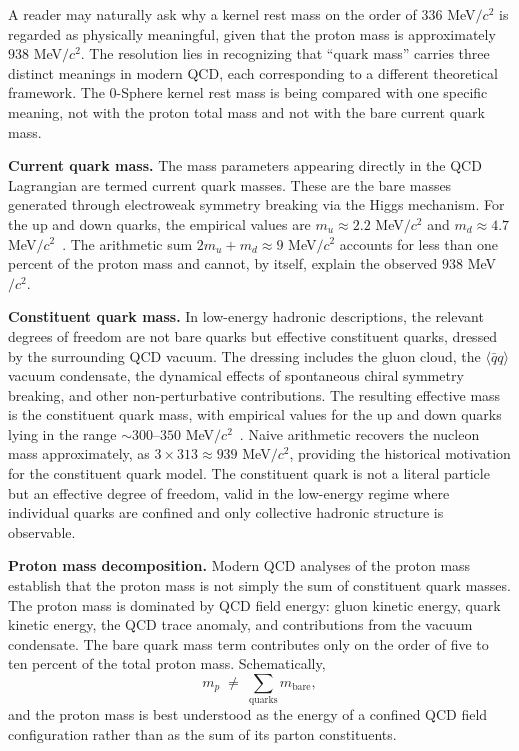\documentclass[%
 reprint, amsmath,amssymb, aps, prc, ]{revtex4-2}
\numberwithin{equation}{section}
\begin{document}
A reader may naturally ask why a kernel rest mass on the order of $336$ MeV$/c^2$ is regarded as physically meaningful, given that the proton mass is approximately $938$ MeV$/c^2$. The resolution lies in recognizing that ``quark mass'' carries three distinct meanings in modern QCD, each corresponding to a different theoretical framework. The 0-Sphere kernel rest mass is being compared with one specific meaning, not with the proton total mass and not with the bare current quark mass.

\medskip

\noindent\textbf{Current quark mass.}
The mass parameters appearing directly in the QCD Lagrangian are termed current quark masses. These are the bare masses generated through electroweak symmetry breaking via the Higgs mechanism. For the up and down quarks, the empirical values are $m_u \approx 2.2$ MeV$/c^2$ and $m_d \approx 4.7$ MeV$/c^2$~\cite{PDG}. The arithmetic sum $2 m_u + m_d \approx 9$ MeV$/c^2$ accounts for less than one percent of the proton mass and cannot, by itself, explain the observed $938$ MeV$/c^2$.

\medskip

\noindent\textbf{Constituent quark mass.}
In low-energy hadronic descriptions, the relevant degrees of freedom are not bare quarks but effective constituent quarks, dressed by the surrounding QCD vacuum. The dressing includes the gluon cloud, the $\langle\bar{q}q\rangle$ vacuum condensate, the dynamical effects of spontaneous chiral symmetry breaking, and other non-perturbative contributions. The resulting effective mass is the constituent quark mass, with empirical values for the up and down quarks lying in the range $\sim 300\text{--}350$ MeV$/c^2$~\cite{HalzenMartin,Griffiths,EntemReview}. Naive arithmetic recovers the nucleon mass approximately, as $3 \times 313 \approx 939$ MeV$/c^2$, providing the historical motivation for the constituent quark model. The constituent quark is not a literal particle but an effective degree of freedom, valid in the low-energy regime where individual quarks are confined and only collective hadronic structure is observable.

\medskip

\noindent\textbf{Proton mass decomposition.}
Modern QCD analyses of the proton mass~\cite{Ji1995,Yang2018} establish that the proton mass is not simply the sum of constituent quark masses. The proton mass is dominated by QCD field energy: gluon kinetic energy, quark kinetic energy, the QCD trace anomaly, and contributions from the vacuum condensate. The bare quark mass term contributes only on the order of five to ten percent of the total proton mass. Schematically,
\begin{equation}
m_p \;\neq\; \sum_{\text{quarks}} m_{\text{bare}},
\label{eq:mp_neq_sum}
\end{equation}
and the proton mass is best understood as the energy of a confined QCD field configuration rather than as the sum of its parton constituents.
\end{document}
